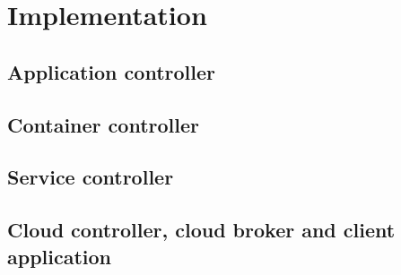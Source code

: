 \chapter{Implementation}


\section{Application controller}
\section{Container controller}
\section{Service controller}
\section{Cloud controller, cloud broker and client application}

